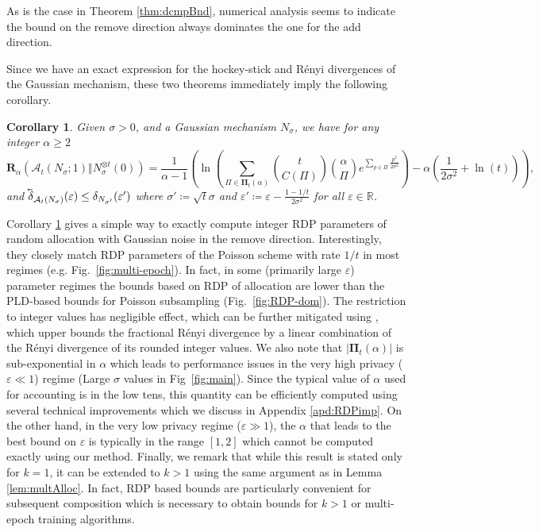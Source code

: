 \documentclass{article}
\theoremstyle{plain}
\newtheorem{corollary}[theorem]{Corollary}
\theoremstyle{definition}
\newcommand{\eps}{\varepsilon}
\newcommand{\reals}{\mathbb{R}}
\newcommand{\lvec}[1]{\reflectbox{$\vec{\reflectbox{$#1$}}$}}
\newcommand{\Renyi}[1]{\boldsymbol{R}_{#1}}
\newcommand{\RenyiDiv}[3]{\Renyi{#1}\left(#2 \Vert #3 \right)}
\newcommand{\alloc}[2]{\mathcal{A}_{#1}\left(#2\right)}
\newcommand{\allocFunc}[3]{\mathcal{A}_{#1}\left(#2; #3\right)}
\newcommand{\add}[1]{\lvec{#1}}
\newcommand{\privProf}[1]{\delta_{#1}}
\newcommand{\privProfAdd}[1]{\add{\delta}_{#1}}
\begin{document}
As is the case in Theorem \ref{thm:dcmpBnd}, numerical analysis seems to indicate the bound on the remove direction always dominates the one for the add direction.

Since we have an exact expression for the hockey-stick and R\'{e}nyi divergences of the Gaussian mechanism, these two theorems immediately imply the following corollary.
\begin{corollary}\label{cor:dirGauss}
    Given $\sigma > 0$, and a Gaussian mechanism $N_{\sigma}$, we have for any integer $\alpha \ge 2$
    \[
        \RenyiDiv{\alpha}{\allocFunc{t}{N_{\sigma}}{1}}{N_{\sigma}^{\otimes t}(0)} = \frac{1}{\alpha - 1} \left(\ln \left(\sum_{\Pi \in \boldsymbol{\Pi}_{t}(\alpha)} \binom{t}{C(\Pi)} \binom{\alpha}{\Pi} e^{\underset{p \in \Pi}{\sum}\frac{p^{2}}{2 \sigma^{2}}} \right) - \alpha \left(\frac{1}{2 \sigma^{2}} + \ln (t) \right) \right),
    \]
    and $\privProfAdd{\alloc{t}{N_{\sigma}}}(\eps) \le \privProf{N_{\sigma'}}(\eps')$ where $\sigma' \coloneqq \sqrt{t} \sigma$ and $\eps' \coloneqq \eps - \frac{1-1/t}{2 \sigma^{2}}$ for all $\eps \in \reals$.
\end{corollary}

Corollary \ref{cor:dirGauss} gives a simple way to exactly compute integer RDP parameters of random allocation with Gaussian noise in the remove direction. Interestingly, they closely match RDP parameters of the Poisson scheme with rate $1/t$ in most regimes (e.g. Fig.~\ref{fig:multi-epoch}). In fact, in some (primarily large $\eps$) parameter regimes the bounds based on RDP of allocation are lower than the PLD-based bounds for Poisson subsampling (Fig.~\ref{fig:RDP-dom}). The restriction to integer values has negligible effect, which can be further mitigated using \citep[Corollary 10]{WBK19}, which upper bounds the fractional R\'{e}nyi divergence by a linear combination of the R\'{e}nyi divergence of its rounded integer values. We also note that $\vert \boldsymbol{\Pi}_{t}(\alpha) \vert$ is sub-exponential in $\alpha$ which leads to performance issues in the very high privacy ($\eps \ll 1$) regime (Large $\sigma$ values in Fig~\ref{fig:main}). Since the typical value of $\alpha$ used for accounting is in the low tens, this quantity can be efficiently computed using several technical improvements which we discuss in Appendix \ref{apd:RDPimp}. On the other hand, in the very low privacy regime ($\eps \gg 1$), the $\alpha$ that leads to the best bound on $\eps$ is typically in the range $[1,2]$ which cannot be computed exactly using our method. Finally, we remark that while this result is stated only for $k=1$, it can be extended to $k>1$ using the same argument as in Lemma \ref{lem:multAlloc}. In fact, RDP based bounds are particularly convenient for subsequent composition which is necessary to obtain bounds for $k>1$ or multi-epoch training algorithms.
\end{document}
